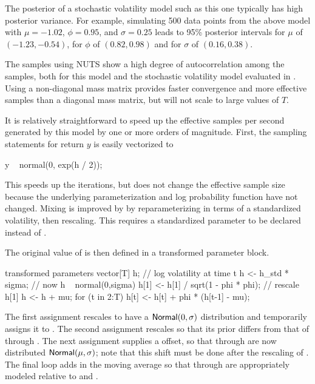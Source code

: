 The posterior of a stochastic volatility model such as this one
typically has high posterior variance.  For example, simulating 500
data points from the above model with $\mu = -1.02$, $\phi = 0.95$,
and $\sigma = 0.25$ leads to 95\% posterior intervals for $\mu$ of
$(-1.23, -0.54)$, for $\phi$ of $(0.82,0.98 )$ and for $\sigma$ of
$(0.16,0.38)$. 

The samples using NUTS show a high degree of autocorrelation among the
samples, both for this model and the stochastic volatility model
evaluated in \citep{Hoffman-Gelman:2011, Hoffman-Gelman:2014}.  
Using a non-diagonal mass
matrix provides faster convergence and more effective samples than a
diagonal mass matrix, but will not scale to large values of $T$.

It is relatively straightforward to speed up the effective samples per
second generated by this model by one or more orders of magnitude.
First, the sampling statements for return $y$ is easily vectorized to
%
\begin{stancode}
y ~ normal(0, exp(h / 2));
\end{stancode}
%
This speeds up the iterations, but does not change the effective
sample size because the underlying parameterization and log
probability function have not changed.  Mixing is improved by by
reparameterizing in terms of a standardized volatility, then
rescaling.  This requires a standardized parameter  to be
declared instead of .
\begin{stancode}
parameters {
  ...
  vector[T] h_std;             // std log volatility time t
\end{stancode}
%
The original value of  is then defined in a transformed
parameter block.
%
\begin{stancode}
transformed parameters {
  vector[T] h;            // log volatility at time t
  h <- h_std * sigma;     // now h ~ normal(0,sigma)
  h[1] <- h[1] / sqrt(1 - phi * phi);  // rescale h[1]
  h <- h + mu;
  for (t in 2:T)
    h[t] <- h[t] + phi * (h[t-1] - mu);
}
\end{stancode}
%
The first assignment rescales  to have a
$\distro{Normal}(0,\sigma)$ distribution and temporarily assigns it to
.  The second assignment rescales  so that its
prior differs from that of  through .  The next
assignment supplies a  offset, so that  through
 are now distributed $\distro{Normal}(\mu,\sigma)$; note
that this shift must be done after the rescaling of .  The
final loop adds in the moving average so that  through
 are appropriately modeled relative to  and
.

